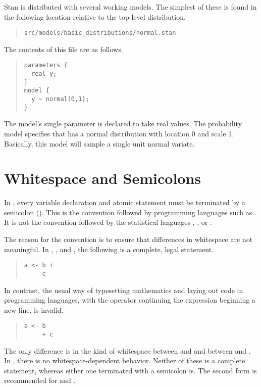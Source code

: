 Stan is distributed with several working models.  The simplest of
these is found in the following location relative to the top-level
distribution.
%
\begin{quote}
\begin{Verbatim}
src/models/basic_distributions/normal.stan
\end{Verbatim}
\end{quote}
%
The contents of this file are as follows.
%
\begin{quote}
\begin{Verbatim}
parameters {
  real y;
}
model {
  y ~ normal(0,1);
}
\end{Verbatim}
\end{quote}
%
The model's single parameter  is declared to take real values.
The probability model specifies that  has a normal
distribution with location 0 and scale 1.  Basically, this model will
sample a single unit normal variate.  

\section{Whitespace and Semicolons}

In \Stan, every variable declaration and atomic statement must be
terminated by a semicolon (\code{;}).  This is the convention followed
by programming languages such as \Cpp.  It is not the convention
followed by the statistical languages \R, \BUGS, or \JAGS.

The reason for the \Cpp convention is to ensure that differences in
whitespace are not meaningful.  In \R, \BUGS, and \JAGS, the following
is a complete, legal statement.
%
\begin{quote}
\begin{Verbatim}
a <- b +
     c
\end{Verbatim}
\end{quote}
%
In contrast, the usual way of typesetting mathematics and laying out
code in programming languages, with the operator continuing the
expression beginning a new line, is invalid.
%
\begin{quote}
\begin{Verbatim}
a <- b
     + c
\end{Verbatim}
\end{quote}
%
The only difference is in the kind of whitespace between  and
\code{+} and between \code{+} and .  In \Stan, there is no
whitespace-dependent behavior.  Neither of these is a complete
statement, whereas either one terminated with a semicolon is.  The
second form is recommended for \Cpp and \Stan.


